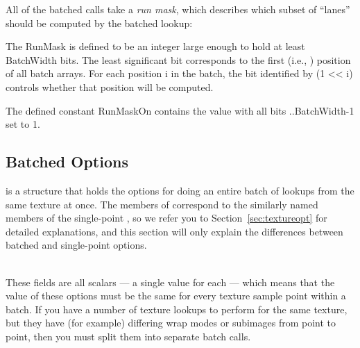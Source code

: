 All of the batched calls take a \emph{run mask}, which describes which
subset of ``lanes'' should be computed by the batched lookup:


The {\cf RunMask} is defined to be an integer large enough to hold at least
{\cf BatchWidth} bits. The least significant bit corresponds to the first
(i.e., {\cf [0]}) position of all batch arrays. For each position
{\cf i} in the batch, the bit identified by {\cf (1 << i)} controls whether
that position will be computed.

The defined constant {\cf RunMaskOn} contains the value with all bits
{..BatchWidth-1} set to 1.
\apiend

\subsection{Batched Options}

\label{sec:textureoptbatch}

\TextureOptBatch is a structure that holds the options for doing an entire
batch of lookups from the same texture at once.
The members of \TextureOptBatch correspond to the similarly named members of
the single-point \TextureOpt, so we refer you to
Section~\ref{sec:textureopt} for detailed explanations, and this section
will only explain the differences between batched and single-point options.

 ~\\
These fields are all scalars --- a single value for each \TextureOptBatch
--- which means that the value of these options must be the same for every
texture sample point within a batch. If you have a number of texture lookups
to perform for the same texture, but they have (for example) differing wrap
modes or subimages from point to point, then you must split them into
separate batch calls.
\apiend

